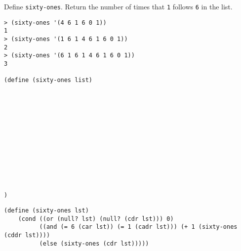 \begin{blocksection}
\question Define \lstinline$sixty-ones$. Return the number of times that \lstinline$1$
follows \lstinline$6$ in the list.

\begin{lstlisting}
> (sixty-ones '(4 6 1 6 0 1))
1
> (sixty-ones '(1 6 1 4 6 1 6 0 1))
2
> (sixty-ones '(6 1 6 1 4 6 1 6 0 1))
3

(define (sixty-ones list)













)
\end{lstlisting}

\begin{solution}[1.5in]
\begin{lstlisting}
(define (sixty-ones lst)
    (cond ((or (null? lst) (null? (cdr lst))) 0)
          ((and (= 6 (car lst)) (= 1 (cadr lst))) (+ 1 (sixty-ones (cddr lst))))
          (else (sixty-ones (cdr lst)))))
\end{lstlisting}
\end{solution}
\end{blocksection}
